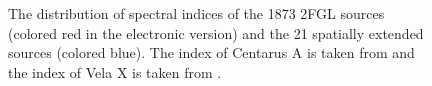 \documentclass[12pt,preprint]{aastex}
\newif\ifcolorfigure
\begin{document}
\clearpage
\begin{figure}
    \ifcolorfigure
      \plotone{summary_plots/compare_index_2FGL_color.eps}
    \else
    \fi
    \caption{
    The distribution of spectral indices of the 1873 2FGL sources
    (colored red in the electronic version) and the 21 spatially extended
    sources (colored blue).  The index of Centarus A is taken from
    \cite{second_cat} and the index of Vela X is taken from \cite{velax}.
    }\label{compare_index_2FGL}
  \end{figure}
\end{document}
